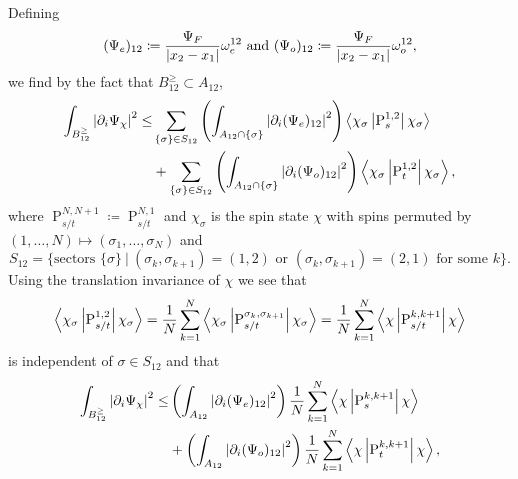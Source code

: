 Defining \begin{equation}
\begin{aligned}
(\Psi_e)_{12}\coloneqq\frac{\Psi_F}{\left\lvert x_2-x_1 \right\rvert}\omega_e^{12}\text{ and } (\Psi_o)_{12}\coloneqq\frac{\Psi_F}{\left\lvert x_2-x_1 \right\rvert}\omega_o^{12},
\end{aligned}
\end{equation}
we find by the fact that $ B_{12}^\geq\subset A_{12} $, \begin{equation}\label{EqEnergy3Spin1/2}
\begin{aligned}
\int_{B_{12}^{\geq}}\left\lvert \partial_i\Psi_{\chi} \right\rvert^2\leq&\sum_{\{\sigma\}\in S_{12}}\left(\int_{A_{12}\cap\{\sigma\}}\left\lvert \partial_i(\Psi_e)_{12} \right\rvert^2\right)\left\langle\chi_{\sigma} \left\lvert \operatorname{P}^{1,2}_s  \right\rvert \chi_\sigma\right\rangle\\
&+\sum_{\{\sigma\}\in S_{12}}\left(\int_{A_{12}\cap \{\sigma\}}\left\lvert \partial_i(\Psi_o)_{12} \right\rvert^2\right)\left\langle\chi_{\sigma} \left\lvert \operatorname{P}^{1,2}_t  \right\rvert \chi_\sigma\right\rangle,
\end{aligned}
\end{equation}
where $ \operatorname{P}_{s/t}^{N,N+1}\coloneqq \operatorname{P}_{s/t}^{N,1} $ and $ \chi_{\sigma} $ is the spin state $ \chi $ with spins permuted by $ (1,\ldots,N)\mapsto(\sigma_1,\ldots,\sigma_N) $ and 
$$ S_{12}=\{\text{sectors } \{\sigma\}\ \vert\ (\sigma_k,\sigma_{k+1})=(1,2)\text{ or }(\sigma_k,\sigma_{k+1})=(2,1)\text{ for some }k\}. $$
Using the translation invariance of $ \chi $ we see that 
$$ \left\langle\chi_{\sigma} \left\lvert \operatorname{P}^{1,2}_{s/t}  \right\rvert \chi_\sigma\right\rangle=\frac{1}{N}\sum_{k=1}^{N}\left\langle\chi_\sigma\left\lvert \operatorname{P}^{\sigma_k,\sigma_{k+1}}_{s/t}  \right\rvert \chi_\sigma\right\rangle=\frac{1}{N}\sum_{k=1}^{N}\left\langle\chi\left\lvert \operatorname{P}^{k,k+1}_{s/t}  \right\rvert \chi\right\rangle $$
is independent of $ \sigma\in S_{12} $ and that
\begin{equation}\label{EqEnergy4Spin1/2}
\begin{aligned}
\int_{B_{12}^{\geq}}\left\lvert \partial_i\Psi_{\chi} \right\rvert^2\leq&\left(\int_{A_{12}}\left\lvert \partial_i(\Psi_e)_{12} \right\rvert^2\right)\frac{1}{N}\sum_{k=1}^{N}\left\langle\chi \left\lvert \operatorname{P}^{k,k+1}_s  \right\rvert \chi\right\rangle\\
&+\left(\int_{A_{12}}\left\lvert \partial_i(\Psi_o)_{12} \right\rvert^2\right)\frac{1}{N}\sum_{k=1}^{N}\left\langle\chi\left\lvert \operatorname{P}^{k,k+1}_t  \right\rvert \chi\right\rangle,
\end{aligned}
\end{equation}


